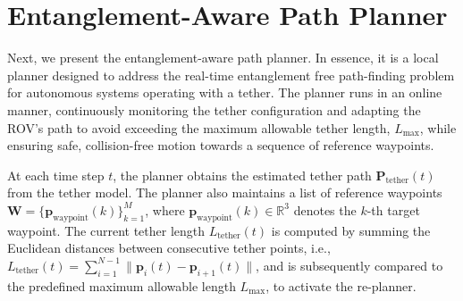 







\section{Entanglement-Aware Path Planner}
\label{sec:planner}

Next, we present the entanglement-aware path planner. In essence, it is a local planner designed to address the real-time entanglement free path-finding problem for autonomous systems operating with a tether. 
The planner runs in an online manner, continuously monitoring the tether configuration and adapting the \ac{ROV}'s path to avoid exceeding the maximum allowable tether length, \( L_{\mathrm{max}} \), while ensuring safe, collision-free motion towards a sequence of reference waypoints.

At each time step \( t \), the planner obtains the estimated tether path  $\mathbf{P}_{\mathrm{tether}}(t)$ from the tether model. The planner also maintains a list of reference waypoints \( \mathbf{W} = \{\mathbf{p}_{\text{waypoint}}(k)\}_{k=1}^{M} \), where \( \mathbf{p}_{\text{waypoint}}(k) \in \mathbb{R}^3 \) denotes the \( k \)-th target waypoint. The current tether length \( L_{\text{tether}}(t) \) is computed by summing the Euclidean distances between consecutive tether points, i.e., \( L_{\text{tether}}(t) = \sum_{i=1}^{N-1} \| \mathbf{p}_i(t) - \mathbf{p}_{i+1}(t) \| \), and is subsequently compared to the predefined maximum allowable length \( L_{\text{max}} \), to activate the re-planner.

